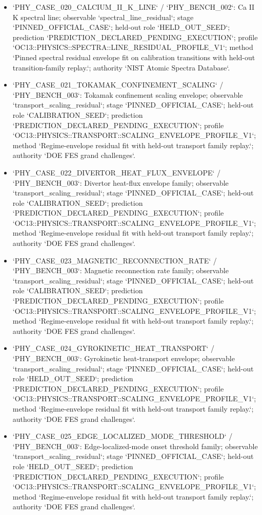 \begin{itemize}
\item `PHY\_CASE\_020\_CALCIUM\_II\_K\_LINE` / `PHY\_BENCH\_002`: Ca II K spectral line; observable `spectral\_line\_residual`; stage `PINNED\_OFFICIAL\_CASE`; held-out role `HELD\_OUT\_SEED`; prediction `PREDICTION\_DECLARED\_PENDING\_EXECUTION`; profile `OC13::PHYSICS::SPECTRA::LINE\_RESIDUAL\_PROFILE\_V1`; method `Pinned spectral residual envelope fit on calibration transitions with held-out transition-family replay.`; authority `NIST Atomic Spectra Database`.
\item `PHY\_CASE\_021\_TOKAMAK\_CONFINEMENT\_SCALING` / `PHY\_BENCH\_003`: Tokamak confinement scaling envelope; observable `transport\_scaling\_residual`; stage `PINNED\_OFFICIAL\_CASE`; held-out role `CALIBRATION\_SEED`; prediction `PREDICTION\_DECLARED\_PENDING\_EXECUTION`; profile `OC13::PHYSICS::TRANSPORT::SCALING\_ENVELOPE\_PROFILE\_V1`; method `Regime-envelope residual fit with held-out transport family replay.`; authority `DOE FES grand challenges`.
\item `PHY\_CASE\_022\_DIVERTOR\_HEAT\_FLUX\_ENVELOPE` / `PHY\_BENCH\_003`: Divertor heat-flux envelope family; observable `transport\_scaling\_residual`; stage `PINNED\_OFFICIAL\_CASE`; held-out role `CALIBRATION\_SEED`; prediction `PREDICTION\_DECLARED\_PENDING\_EXECUTION`; profile `OC13::PHYSICS::TRANSPORT::SCALING\_ENVELOPE\_PROFILE\_V1`; method `Regime-envelope residual fit with held-out transport family replay.`; authority `DOE FES grand challenges`.
\item `PHY\_CASE\_023\_MAGNETIC\_RECONNECTION\_RATE` / `PHY\_BENCH\_003`: Magnetic reconnection rate family; observable `transport\_scaling\_residual`; stage `PINNED\_OFFICIAL\_CASE`; held-out role `CALIBRATION\_SEED`; prediction `PREDICTION\_DECLARED\_PENDING\_EXECUTION`; profile `OC13::PHYSICS::TRANSPORT::SCALING\_ENVELOPE\_PROFILE\_V1`; method `Regime-envelope residual fit with held-out transport family replay.`; authority `DOE FES grand challenges`.
\item `PHY\_CASE\_024\_GYROKINETIC\_HEAT\_TRANSPORT` / `PHY\_BENCH\_003`: Gyrokinetic heat-transport envelope; observable `transport\_scaling\_residual`; stage `PINNED\_OFFICIAL\_CASE`; held-out role `HELD\_OUT\_SEED`; prediction `PREDICTION\_DECLARED\_PENDING\_EXECUTION`; profile `OC13::PHYSICS::TRANSPORT::SCALING\_ENVELOPE\_PROFILE\_V1`; method `Regime-envelope residual fit with held-out transport family replay.`; authority `DOE FES grand challenges`.
\item `PHY\_CASE\_025\_EDGE\_LOCALIZED\_MODE\_THRESHOLD` / `PHY\_BENCH\_003`: Edge-localized-mode onset threshold family; observable `transport\_scaling\_residual`; stage `PINNED\_OFFICIAL\_CASE`; held-out role `HELD\_OUT\_SEED`; prediction `PREDICTION\_DECLARED\_PENDING\_EXECUTION`; profile `OC13::PHYSICS::TRANSPORT::SCALING\_ENVELOPE\_PROFILE\_V1`; method `Regime-envelope residual fit with held-out transport family replay.`; authority `DOE FES grand challenges`.

\end{itemize}
